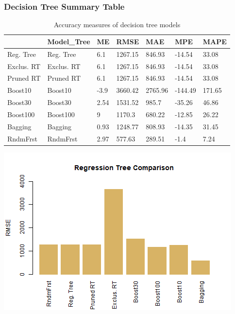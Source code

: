 \documentclass[
  paper=a4,
  ,captions=tableheading
]{scrartcl}
\begin{document}
\hypertarget{decision-tree-summary-table}{%
\subsubsection{Decision Tree Summary
Table}\label{decision-tree-summary-table}}

\begin{table}[!h]

\caption{\label{tab:RegTree Summary}Accuracy measures of decision tree models}
\centering
\begin{tabu} to 
\hline
  & Model\_Tree & ME & RMSE & MAE & MPE & MAPE\\
\hline
Reg. Tree & Reg. Tree & 6.1 & 1267.15 & 846.93 & -14.54 & 33.08\\
\hline
Exclus. RT & Exclus. RT & 6.1 & 1267.15 & 846.93 & -14.54 & 33.08\\
\hline
Pruned RT & Pruned RT & 6.1 & 1267.15 & 846.93 & -14.54 & 33.08\\
\hline
Boost10 & Boost10 & -3.9 & 3660.42 & 2765.96 & -144.49 & 171.65\\
\hline
Boost30 & Boost30 & 2.54 & 1531.52 & 985.7 & -35.26 & 46.86\\
\hline
Boost100 & Boost100 & 9 & 1170.3 & 680.22 & -12.85 & 26.22\\
\hline
Bagging & Bagging & 0.93 & 1248.77 & 808.93 & -14.35 & 31.45\\
\hline
RndmFrst & RndmFrst & 2.97 & 577.63 & 289.51 & -1.4 & 7.24\\
\hline
\end{tabu}
\end{table}

\begin{center}\includegraphics{Diamonds_PDF_files/figure-latex/RegTree Summary-1} \end{center}
\end{document}
